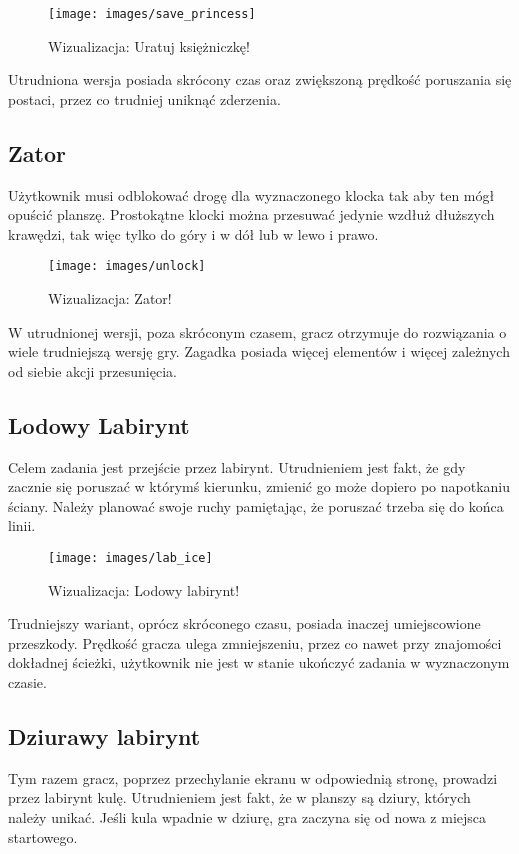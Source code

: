 \documentclass[openright]{xmgr}
\begin{document}
\begin{figure}[h]
\centering
\texttt{[image: images/save\_princess]}
\caption{Wizualizacja: Uratuj księżniczkę!}
\label{fig:save_princess}
\end{figure}

Utrudniona wersja posiada skrócony czas oraz zwiększoną prędkość poruszania się postaci, przez co trudniej uniknąć zderzenia.

\subsection{Zator}
Użytkownik musi odblokować drogę dla wyznaczonego klocka tak aby ten
mógł opuścić planszę. Prostokątne klocki można przesuwać jedynie wzdłuż
dłuższych krawędzi, tak więc tylko do góry i w dół lub w lewo i prawo.

\begin{figure}[h]
\centering
\texttt{[image: images/unlock]}
\caption{Wizualizacja: Zator!}
\label{fig:unlock}
\end{figure}

W utrudnionej wersji, poza skróconym czasem, gracz otrzymuje do rozwiązania o wiele trudniejszą wersję gry. Zagadka posiada więcej elementów i więcej zależnych od siebie akcji przesunięcia.

\subsection{Lodowy Labirynt}
Celem zadania jest przejście przez labirynt. Utrudnieniem jest fakt, że gdy
zacznie się poruszać w którymś kierunku, zmienić go może dopiero po napotkaniu ściany. Należy planować swoje ruchy pamiętając, że poruszać trzeba się do końca linii.

\begin{figure}[h]
\centering
\texttt{[image: images/lab\_ice]}
\caption{Wizualizacja: Lodowy labirynt!}
\label{fig:lab_ice}
\end{figure}

Trudniejszy wariant, oprócz skróconego czasu, posiada inaczej umiejscowione przeszkody.
Prędkość gracza ulega zmniejszeniu, przez co nawet przy znajomości dokładnej ścieżki, użytkownik nie jest w stanie ukończyć zadania w wyznaczonym czasie.

\subsection{Dziurawy labirynt}
Tym razem gracz, poprzez przechylanie ekranu w odpowiednią stronę, prowadzi przez labirynt kulę. Utrudnieniem jest fakt, że w planszy są dziury, których należy unikać. Jeśli kula wpadnie w dziurę, gra zaczyna się od nowa z miejsca startowego.
\end{document}
